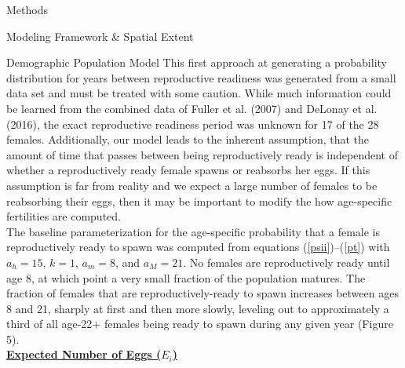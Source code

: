 \documentclass[12pt]{article}
\begin{document}
\begin{section}{Methods}
\begin{subsection}{Modeling Framework \& Spatial Extent}
\begin{subsubsection}{Demographic Population Model}
This first approach at generating a probability distribution for years between reproductive readiness was generated from a small data set and must be treated with some caution.  While much information could be learned from the combined data of Fuller et al. (2007) and DeLonay et al. (2016), the exact reproductive readiness period was unknown for 17 of the 28 females.  Additionally, our model leads to the inherent assumption, that the amount of time that passes between being reproductively ready is independent of whether a reproductively ready female spawns or reabsorbs her eggs.  If this assumption is far from reality and we expect a large number of females to be reabsorbing their eggs, then it may be important to modify the how age-specific fertilities are computed.\\

The baseline parameterization for the age-specific probability that a female is reproductively ready to spawn was computed from equations (\ref{psii})--(\ref{pt}) with $a_h=15$, $k=1$, $a_m=8$, and $a_M=21$.  No females are reproductively ready until age 8, at which point a very small fraction of the population matures.  The fraction of females that are reproductively-ready to spawn increases between ages 8 and 21, sharply at first and then more slowly, leveling out to approximately a third of all age-22+ females being ready to spawn during any given year (Figure 5).\\

\textbf{\underline{Expected Number of Eggs ($E_i$)}}\\


\end{subsubsection}
\end{subsection}
\end{section}
\end{document}
